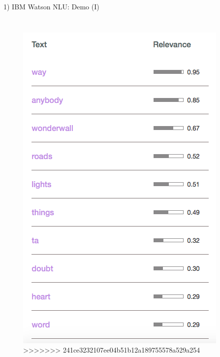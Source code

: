 \documentclass[xcolor=dvipsnames]{beamer}
\begin{document}
\begin{frame}{1) IBM Watson NLU: Demo (I)}
\begin{columns}
\begin{figure}
	\includegraphics[scale=0.25]{./images/keywords}
>>>>>>> 241ce3232107ee04b51b12a189755578a529a254
\end{figure}
\end{columns}
\end{frame}
\end{document}
